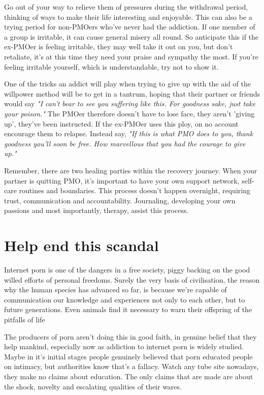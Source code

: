 \documentclass[easypeasy.tex]{subfiles}
\begin{document}
Go out of your way to relieve them of pressures during the withdrawal period, thinking of ways to make their life interesting and enjoyable. This can also be a trying period for non-PMOers who've never had the addiction. If one member of a group is irritable, it can cause general misery all round. So anticipate this if the ex-PMOer is feeling irritable, they may well take it out on you, but don't retaliate, it's at this time they need your praise and sympathy the most. If you're feeling irritable yourself, which is understandable, try not to show it.

One of the tricks an addict will play when trying to give up with the aid of the willpower method will be to get in a tantrum, hoping that their partner or friends would say \textit{"I can't bear to see you suffering like this. For goodness sake, just take your poison."} The PMOer therefore doesn't have to lose face, they aren't 'giving up', they've been instructed. If the ex-PMOer uses this ploy, on no account encourage them to relapse. Instead say, \textit{"If this is what PMO does to you, thank goodness you'll soon be free. How marvellous that you had the courage to give up."}

Remember, there are two healing parties within the recovery journey. When your partner is quitting PMO, it's important to have your own support network, self-care routines and boundaries. This process doesn't happen overnight, requiring trust, communication and accountability. Journaling, developing your own passions and most importantly, therapy, assist this process.

\section{Help end this scandal}

Internet porn is one of the dangers in a free society, piggy backing on the good willed efforts of personal freedoms. Surely the very basis of civilisation, the reason why the human species has advanced so far, is because we're capable of communication our knowledge and experiences not only to each other, but to future generations. Even animals find it necessary to warn their offspring of the pitfalls of life

The producers of porn aren't doing this in good faith, in genuine belief that they help mankind, especially now as addiction to internet porn is widely studied. Maybe in it's initial stages people genuinely believed that porn educated people on intimacy, but authorities know that's a fallacy. Watch any tube site nowadays, they make no claims about education. The only claims that are made are about the shock, novelty and escalating qualities of their wares.
\end{document}

